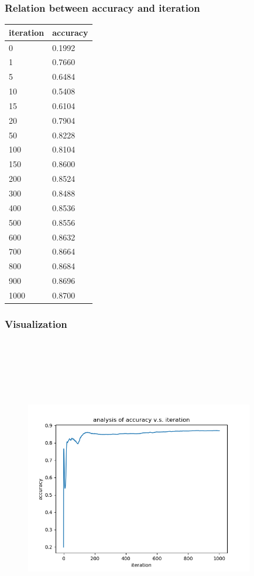 \documentclass[]{article}
\begin{document}
\begin{CJK*}{UTF8}{bsmi}
\hypertarget{header-n17}{%
\subsubsection{Relation between accuracy and
iteration}\label{header-n17}}

\begin{longtable}[]{ll}
\toprule
iteration & accuracy\tabularnewline
\midrule
\endhead
0 & 0.1992\tabularnewline
1 & 0.7660\tabularnewline
5 & 0.6484\tabularnewline
10 & 0.5408\tabularnewline
15 & 0.6104\tabularnewline
20 & 0.7904\tabularnewline
50 & 0.8228\tabularnewline
100 & 0.8104\tabularnewline
150 & 0.8600\tabularnewline
200 & 0.8524\tabularnewline
300 & 0.8488\tabularnewline
400 & 0.8536\tabularnewline
500 & 0.8556\tabularnewline
600 & 0.8632\tabularnewline
700 & 0.8664\tabularnewline
800 & 0.8684\tabularnewline
900 & 0.8696\tabularnewline
1000 & 0.8700\tabularnewline
\bottomrule
\end{longtable}
\clearpage
\hypertarget{header-n76}{%
\subsubsection{Visualization}\label{header-n76}}

\begin{figure}
\centering
\includegraphics[width=10cm, height=13.33cm]{ana.png}
\caption{}
\end{figure}


\end{CJK*}
\end{document}
